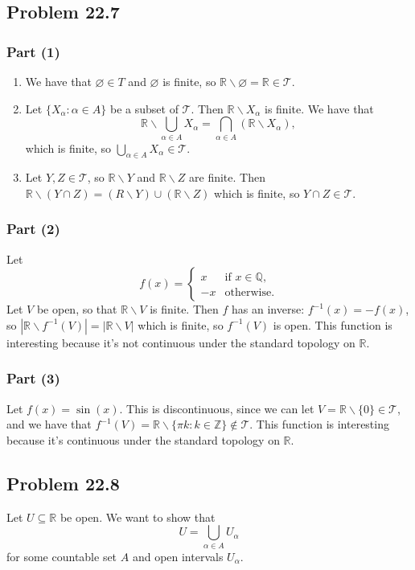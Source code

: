 \documentclass{article}
\newcommand{\R}{\mathbb{R}}
\newcommand{\Z}{\mathbb{Z}}
\newcommand{\Q}{\mathbb{Q}}
\newcommand{\T}{\mathcal{T}}
\newcommand{\nullset}{\varnothing}
\newcommand{\minus}{\backslash}
\begin{document}
\subsection*{Problem 22.7}
\subsubsection*{Part (1)}
\begin{enumerate}
    \item We have that $\nullset \in T$ and $\nullset$ is finite, so $\R \minus \nullset = \R \in \T$.
    
    \item Let $\{X_\alpha : \alpha \in A\}$ be a subset of $\T$. Then $\R \minus X_\alpha$ is finite. We have that
    $$\R \minus \bigcup_{\alpha \in A} X_\alpha = \bigcap_{\alpha \in A} \left(\R \minus X_\alpha\right),$$
    which is finite, so $\bigcup_{\alpha \in A} X_\alpha \in \T$.
    
    \item Let $Y, Z \in \T$, so $\R \minus Y$ and $\R \minus Z$ are finite. Then $\R \minus (Y \cap Z) = (R \minus Y) \cup (\R \minus Z)$ which is finite, so $Y \cap Z \in \T$.
\end{enumerate}

\subsubsection*{Part (2)}
Let
$$f(x) = \begin{cases}
    x & \text{if } x\in \Q, \\
    -x & \text{otherwise}.
\end{cases}$$
Let $V$ be open, so that $\R \minus V$ is finite. Then $f$ has an inverse: $f^{-1}(x) = -f(x)$, so $|\R \minus f^{-1}(V)| = |\R \minus V|$ which is finite, so $f^{-1}(V)$ is open. This function is interesting because it's not continuous under the standard topology on $\R$.

\subsubsection*{Part (3)}
Let $f(x) = \sin(x)$. This is discontinuous, since we can let $V = \R \minus \{0\} \in \T$, and we have that $f^{-1}(V) = \R \minus \{\pi k : k \in \Z\} \not\in \T$. This function is interesting because it's continuous under the standard topology on $\R$.

\subsection*{Problem 22.8}
Let $U \subseteq \R$ be open. We want to show that
$$U = \bigcup_{\alpha \in A} U_\alpha$$
for some countable set $A$ and open intervals $U_\alpha$. \\
\end{document}
